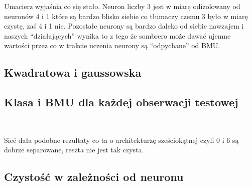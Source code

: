 \documentclass[11pt]{article}
\begin{document}
    Umacierz wyjaśnia co się stało. Neuron liczby 3 jest w miarę odizolowany
od neuronów 4 i 1 które są bardzo blisko siebie co tłumaczy czemu 3 było
w miarę czystę, zaś 4 i 1 nie. Pozostałe neurony są bardzo daleko od
siebie nawzajem i naszych ``działających'' wynika to z tego że sombrero
może dawać ujemne wartości przez co w trakcie uczenia neurony są
``odpychane'' od BMU.

    \hypertarget{kwadratowa-i-gaussowska}{%
\subsection{Kwadratowa i gaussowska}\label{kwadratowa-i-gaussowska}}

    \hypertarget{klasa-i-bmu-dla-kaux17cdej-obserwacji-testowej}{%
\subsection{Klasa i BMU dla każdej obserwacji
testowej}\label{klasa-i-bmu-dla-kaux17cdej-obserwacji-testowej}}

            
        
    \begin{center}
    \end{center}
    { \hspace*{\fill} \\}
    
    Sieć dała podobne rezultaty co ta o architekturzę sześciokątnej czyli 0
i 6 są dobrze separowane, reszta nie jest tak czysta.

    \hypertarget{czystoux15bux107-w-zaleux17cnoux15bci-od-neuronu}{%
\subsection{Czystość w zależności od
neuronu}\label{czystoux15bux107-w-zaleux17cnoux15bci-od-neuronu}}

            
        
    


    
    \begin{center}
    \end{center}
    { \hspace*{\fill} \\}
    
\end{document}

